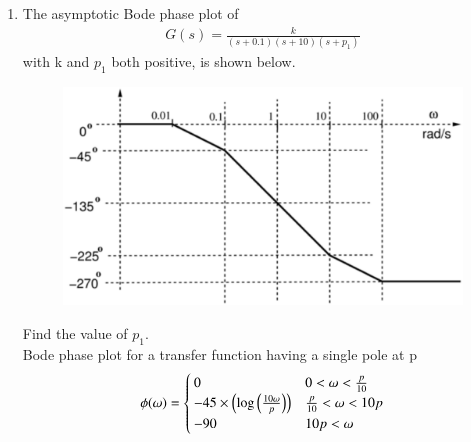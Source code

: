 \begin{enumerate}[label=\thesubsection.\arabic*.,ref=\thesubsection.\theenumi]


\item The asymptotic Bode phase plot of 
%
\begin{align}
\label{eq:ee18btech11037_gs}
G(s) = \frac{k}{(s+0.1)(s+10)(s+{p_1})}
\end{align}
%
with k and $p_1$ both positive, is shown below.
\begin{figure}[!ht]
\centering
\includegraphics[width=\columnwidth]{figs/ee18btech11037/ee18btech11037.eps}
\caption{}
\label{fig:ee18btech11037}
\end{figure}
Find the value of \textit{$p_1$}.
\\
\solution
Bode phase plot for a transfer function having a single pole at p
\begin{align}
 \phi(\omega) = 
 \begin{cases} 
        0 & 0<\omega< \frac{p}{10} \\
      -45\times\left(\log\left(\frac{10\omega}{p}\right)\right)& \frac{p}{10}<\omega<10p \\
      -90 & 10p<\omega  
 \end{cases}
\end{align}


\end{enumerate}
